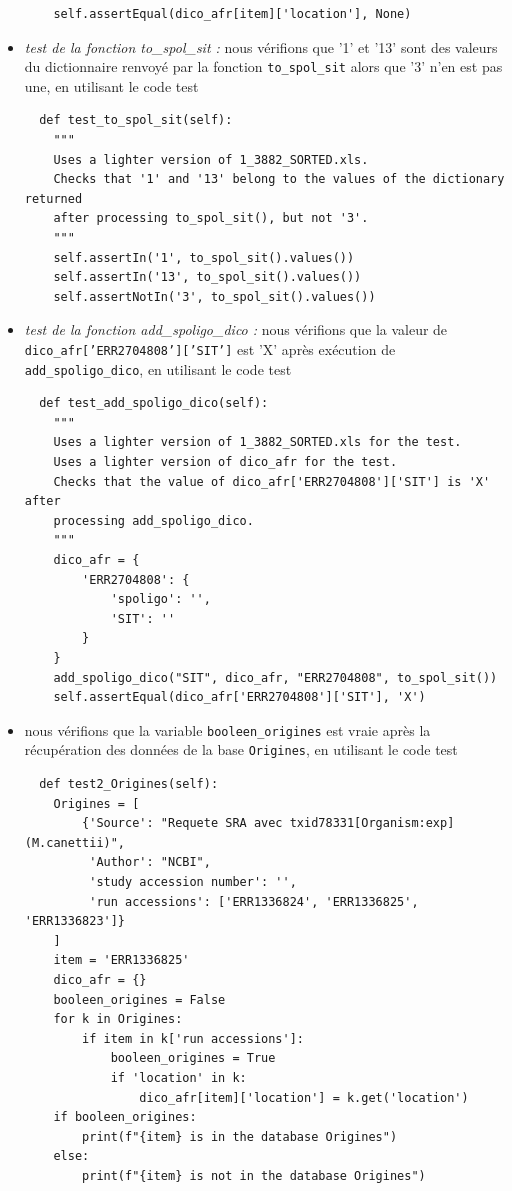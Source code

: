 \documentclass[twoside,a4paper,11pt,frenchb,openany]{report}
\begin{document}
\begin{itemize}
\begin{verbatim}
    self.assertEqual(dico_afr[item]['location'], None)
\end{verbatim}
\item \textit{test de la fonction to\_spol\_sit :} nous vérifions que '1' et '13' sont des valeurs du dictionnaire renvoyé par la fonction \texttt{to\_spol\_sit} alors que '3' n'en est pas une, en utilisant le code test
\begin{verbatim}
  def test_to_spol_sit(self):
    """
    Uses a lighter version of 1_3882_SORTED.xls.
    Checks that '1' and '13' belong to the values of the dictionary returned
    after processing to_spol_sit(), but not '3'.
    """
    self.assertIn('1', to_spol_sit().values())
    self.assertIn('13', to_spol_sit().values())
    self.assertNotIn('3', to_spol_sit().values())
\end{verbatim}
\item \textit{test de la fonction add\_spoligo\_dico :} nous vérifions que la valeur de \texttt{dico\_afr['ERR2704808']['SIT']} est 'X' après exécution de \texttt{add\_spoligo\_dico}, en utilisant le code test
\begin{verbatim}
  def test_add_spoligo_dico(self):
    """
    Uses a lighter version of 1_3882_SORTED.xls for the test.
    Uses a lighter version of dico_afr for the test.
    Checks that the value of dico_afr['ERR2704808']['SIT'] is 'X' after
    processing add_spoligo_dico.
    """
    dico_afr = {
        'ERR2704808': {
            'spoligo': '',
            'SIT': ''
        }
    }
    add_spoligo_dico("SIT", dico_afr, "ERR2704808", to_spol_sit())
    self.assertEqual(dico_afr['ERR2704808']['SIT'], 'X')
\end{verbatim}
\item nous vérifions que la variable \texttt{booleen\_origines} est vraie après la récupération des données de la base \texttt{Origines}, en utilisant le code test
\begin{verbatim}
  def test2_Origines(self):
    Origines = [
        {'Source': "Requete SRA avec txid78331[Organism:exp] (M.canettii)",
         'Author': "NCBI",
         'study accession number': '',
         'run accessions': ['ERR1336824', 'ERR1336825', 'ERR1336823']}
    ]
    item = 'ERR1336825'
    dico_afr = {}
    booleen_origines = False
    for k in Origines:
        if item in k['run accessions']:
            booleen_origines = True
            if 'location' in k:
                dico_afr[item]['location'] = k.get('location')
    if booleen_origines:
        print(f"{item} is in the database Origines")
    else:
        print(f"{item} is not in the database Origines")

\end{verbatim}
\end{itemize}
\end{document}
